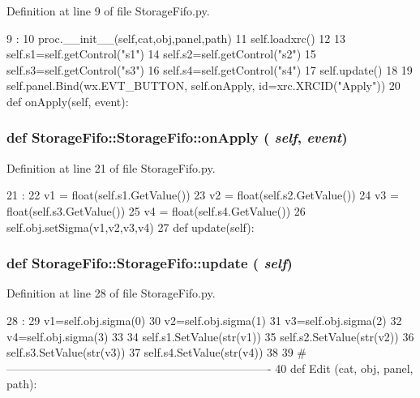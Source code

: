 Definition at line 9 of file StorageFifo.py.


\begin{DoxyCode}
9                                              :
10         proc.__init__(self,cat,obj,panel,path)
11         self.loadxrc()
12 
13         self.s1=self.getControl("s1")
14         self.s2=self.getControl("s2")
15         self.s3=self.getControl("s3")
16         self.s4=self.getControl("s4")
17         self.update()
18 
19         self.panel.Bind(wx.EVT_BUTTON, self.onApply, id=xrc.XRCID("Apply"))
20 
    def onApply(self, event):
\end{DoxyCode}
\hypertarget{classStorageFifo_1_1StorageFifo_a59d0adc3c8c09e187ece685987fc501a}{
\subsubsection[{onApply}]{\setlength{\rightskip}{0pt plus 5cm}def StorageFifo::StorageFifo::onApply ( {\em self}, \/   {\em event})}}
\label{classStorageFifo_1_1StorageFifo_a59d0adc3c8c09e187ece685987fc501a}


Definition at line 21 of file StorageFifo.py.


\begin{DoxyCode}
21                             :
22         v1 = float(self.s1.GetValue())
23         v2 = float(self.s2.GetValue())
24         v3 = float(self.s3.GetValue())
25         v4 = float(self.s4.GetValue())
26         self.obj.setSigma(v1,v2,v3,v4)
27 
    def update(self):
\end{DoxyCode}
\hypertarget{classStorageFifo_1_1StorageFifo_a0af6429cd37d03618907e91bf57928fb}{
\subsubsection[{update}]{\setlength{\rightskip}{0pt plus 5cm}def StorageFifo::StorageFifo::update ( {\em self})}}
\label{classStorageFifo_1_1StorageFifo_a0af6429cd37d03618907e91bf57928fb}


Definition at line 28 of file StorageFifo.py.


\begin{DoxyCode}
28                     :
29         v1=self.obj.sigma(0)
30         v2=self.obj.sigma(1)
31         v3=self.obj.sigma(2)
32         v4=self.obj.sigma(3)
33 
34         self.s1.SetValue(str(v1))
35         self.s2.SetValue(str(v2))
36         self.s3.SetValue(str(v3))
37         self.s4.SetValue(str(v4))        
38 
39 #----------------------------------------------------------------------
40 
def Edit (cat, obj, panel, path):
\end{DoxyCode}


